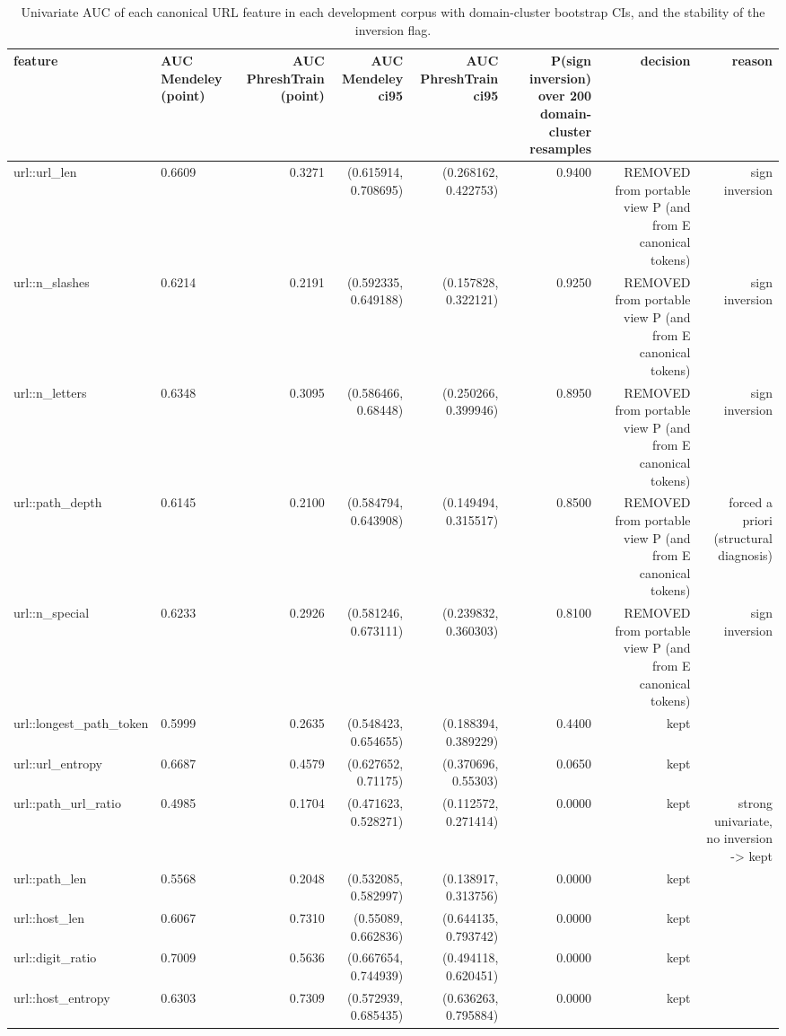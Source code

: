 \begin{table}[t]
\centering
\scriptsize
\caption{Univariate AUC of each canonical URL feature in each development corpus with domain-cluster bootstrap CIs, and the stability of the inversion flag.}
\label{tab:rev_R8_shortcut_flag_stability}
\begin{tabular}{llrrrrrr}
\toprule
feature & AUC Mendeley (point) & AUC PhreshTrain (point) & AUC Mendeley ci95 & AUC PhreshTrain ci95 & P(sign inversion) over 200 domain-cluster resamples & decision & reason \\
\midrule
url::url\_len & 0.6609 & 0.3271 & (0.615914, 0.708695) & (0.268162, 0.422753) & 0.9400 & REMOVED from portable view P (and from E canonical tokens) & sign inversion \\
url::n\_slashes & 0.6214 & 0.2191 & (0.592335, 0.649188) & (0.157828, 0.322121) & 0.9250 & REMOVED from portable view P (and from E canonical tokens) & sign inversion \\
url::n\_letters & 0.6348 & 0.3095 & (0.586466, 0.68448) & (0.250266, 0.399946) & 0.8950 & REMOVED from portable view P (and from E canonical tokens) & sign inversion \\
url::path\_depth & 0.6145 & 0.2100 & (0.584794, 0.643908) & (0.149494, 0.315517) & 0.8500 & REMOVED from portable view P (and from E canonical tokens) & forced a priori (structural diagnosis) \\
url::n\_special & 0.6233 & 0.2926 & (0.581246, 0.673111) & (0.239832, 0.360303) & 0.8100 & REMOVED from portable view P (and from E canonical tokens) & sign inversion \\
url::longest\_path\_token & 0.5999 & 0.2635 & (0.548423, 0.654655) & (0.188394, 0.389229) & 0.4400 & kept &  \\
url::url\_entropy & 0.6687 & 0.4579 & (0.627652, 0.71175) & (0.370696, 0.55303) & 0.0650 & kept &  \\
url::path\_url\_ratio & 0.4985 & 0.1704 & (0.471623, 0.528271) & (0.112572, 0.271414) & 0.0000 & kept & strong univariate, no inversion -> kept \\
url::path\_len & 0.5568 & 0.2048 & (0.532085, 0.582997) & (0.138917, 0.313756) & 0.0000 & kept &  \\
url::host\_len & 0.6067 & 0.7310 & (0.55089, 0.662836) & (0.644135, 0.793742) & 0.0000 & kept &  \\
url::digit\_ratio & 0.7009 & 0.5636 & (0.667654, 0.744939) & (0.494118, 0.620451) & 0.0000 & kept &  \\
url::host\_entropy & 0.6303 & 0.7309 & (0.572939, 0.685435) & (0.636263, 0.795884) & 0.0000 & kept &  \\

\end{tabular}
\end{table}
